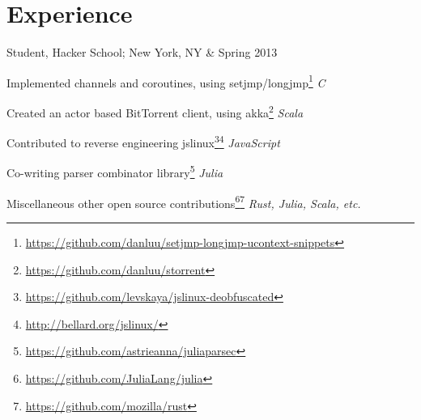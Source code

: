 \documentclass[letterpaper]{scrartcl}
\begin{document}
\section*{Experience}
\begin{list1}
	\item \begin{tabular1bold} Student, Hacker School; New York, NY & Spring 2013 \end{tabular1bold}
\vspace{-8pt}  %
     \begin{list2}
         \item Implemented channels and coroutines, using setjmp/longjmp\footnote{\href{https://github.com/danluu/setjmp-longjmp-ucontext-snippets}{https://github.com/danluu/setjmp-longjmp-ucontext-snippets}} \hfill \emph{C} 
         \item Created an actor based BitTorrent client, using akka\footnote{\href{https://github.com/danluu/storrent}{https://github.com/danluu/storrent}}             \hfill \emph{Scala}
         \item Contributed to reverse engineering jslinux\footnote{\href{https://github.com/levskaya/jslinux-deobfuscated}{https://github.com/levskaya/jslinux-deobfuscated}}\footnote{\href{http://bellard.org/jslinux/}{http://bellard.org/jslinux/}}    \hfill \emph {JavaScript}
         \item Co-writing parser combinator library\footnote{\href{https://github.com/astrieanna/juliaparsec}{https://github.com/astrieanna/juliaparsec}}  \hfill \emph{Julia}
         \item Miscellaneous other open source contributions\footnote{\href{https://github.com/JuliaLang/julia}{https://github.com/JuliaLang/julia}}\footnote{\href{https://github.com/mozilla/rust}{https://github.com/mozilla/rust}} \hfill \emph {Rust, Julia, Scala, etc.}
\end{list2}


\end{list1}
\end{document}
